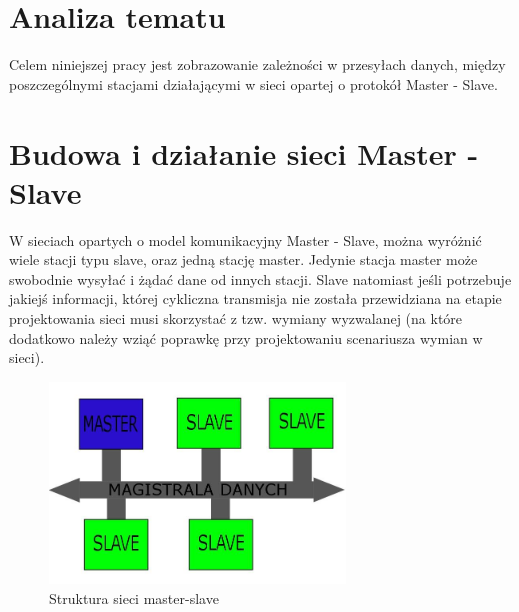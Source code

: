 \section{Analiza tematu}
Celem niniejszej pracy jest zobrazowanie zależności w przesyłach danych, między poszczególnymi stacjami działającymi w sieci opartej o protokół Master - Slave.

\section{Budowa i działanie sieci Master - Slave}
W sieciach opartych o model komunikacyjny Master - Slave, można wyróżnić wiele stacji typu slave, oraz jedną stację master. Jedynie stacja master może swobodnie wysyłać i żądać dane od innych stacji. Slave natomiast jeśli potrzebuje jakiejś informacji, której cykliczna transmisja nie została przewidziana na etapie projektowania sieci musi skorzystać z tzw. wymiany wyzwalanej (na które dodatkowo należy wziąć poprawkę przy projektowaniu scenariusza wymian w sieci).
	\begin{figure}[h]
		\centering
		\includegraphics[width=0.7\textwidth]{./img/siec.jpg}
		\caption{Struktura sieci master-slave}
		\label{fig:siec}
	\end{figure}

